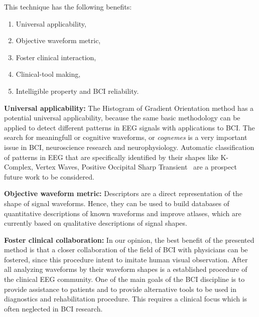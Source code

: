 

\vspace{5pt}

This technique has the following benefits:

\begin{enumerate}
\item Universal applicability,
\item Objective waveform metric,
\item Foster clinical interaction,
\item Clinical-tool making,
\item Intelligible property and BCI reliability.
\end{enumerate}

\textbf{Universal applicability:}
The Histogram of Gradient Orientation method has a potential universal applicability, because the same basic methodology can be applied to detect different patterns in EEG signals with applications to BCI.   The search for meaningfull or cognitive waveforms, or \textit{cognemes} is a very important issue in BCI, neuroscience research and neurophysiology. Automatic classification of patterns in EEG that are specifically identified by their shapes like K-Complex, Vertex Waves, Positive Occipital Sharp Transient~\cite{Hartman2005} are a prospect future work to be considered. 


\textbf{Objective waveform metric:}
Descriptors are a direct representation of the shape of signal waveforms. Hence,  they can be used to build databases of quantitative descriptions of known waveforms and improve atlases, which are currently based on qualitative descriptions of signal shapes.

\textbf{Foster clinical collaboration:}
In our opinion, the best benefit of the presented method is that a closer collaboration of the field of BCI with physicians can be fostered, since this procedure intent to imitate human visual observation. After all analyzing waveforms by their waveform shapes is a established procedure of the clinical EEG community. One of the main goals of the BCI discipline is to provide assistance to patients and to provide alternative tools to be used in diagnostics and rehabilitation procedure.  This requires a clinical focus which is often neglected in BCI research. 

